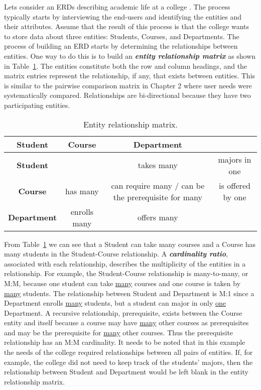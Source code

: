 Lets consider an ERDs describing academic life at a college . The
process typically starts by interviewing the end-users and identifying
the entities and their attributes. Assume that the result of this
process is that the college wants to store data about three entities:
Students, Courses, and Departments. The process of building an ERD
starts by determining the relationships between entities. One way to do
this is to build an \emph{\textbf{entity relationship matrix}} as shown
in Table~\ref{table:entityRelationshipMatrix}. 
The entities constitute both the row and column headings,
and the matrix entries represent the relationship, if any, that exists
between entities. This is similar to the pairwise comparison matrix in
Chapter 2 where user needs were systematically compared. Relationships
are bi-directional because they have two participating entities.

\begin{table}
\caption{Entity relationship matrix.}
\label{table:entityRelationshipMatrix}
\begin{tabular}{|c|c|c|c|}
\hline
\textbf{Student} & \textbf{Course} & \textbf{Department} \\ \hline
\textbf{Student} & & takes many & majors in one \\ \hline
\textbf{Course} & has many & can require many / can be the prerequisite
for many & is offered by one \\ \hline
\textbf{Department} & enrolls many & offers many & \\ \hline
\end{tabular}
\end{table}

From Table~\ref{table:entityRelationshipMatrix} we can 
see that a Student can take many courses and a
Course has many students in the Student-Course relationship. A
\emph{\textbf{cardinality ratio}}, associated with each relationship,
describes the multiplicity of the entities in a relationship. For
example, the Student-Course relationship is many-to-many, or M:M,
because one student can take \ul{many} courses and one course is taken
by \ul{many} students. The relationship between Student and Department
is M:1 since a Department enrolls \ul{many} students, but a student can
major in only \ul{one} Department. A recursive relationship,
prerequisite, exists between the Course entity and itself because a
course may have \ul{many} other courses as prerequisites and may be the
prerequisite for \ul{many} other courses. Thus the prerequisite
relationship has an M:M cardinality. It needs to be noted that in this
example the needs of the college required relationships between all
pairs of entities. If, for example, the college did not need to keep
track of the students' majors, then the relationship between Student and
Department would be left blank in the entity relationship matrix.

